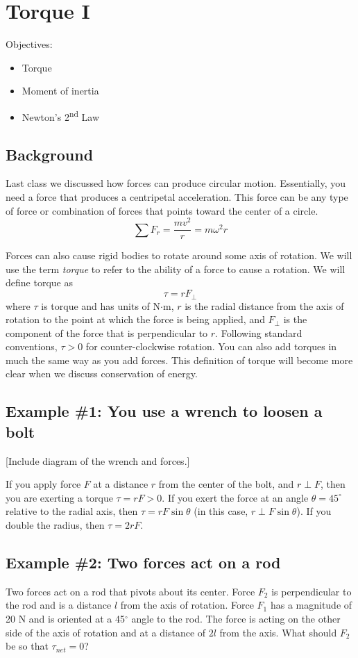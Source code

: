 \section{Torque I}
Objectives:
\begin{itemize}
\item Torque
\item Moment of inertia
\item Newton's 2\textsuperscript{nd} Law
\end{itemize}

\subsection{Background}
Last class we discussed how forces can produce circular motion. Essentially, you need a force that produces a centripetal acceleration. This force can be any type of force or combination of forces that points toward the center of a circle.
$$\sum F_r=\frac{mv^2}{r}=m\omega^2r$$

Forces can also cause rigid bodies to rotate around some axis of rotation. We will use the term \textit{torque} to refer to the ability of a force to cause a rotation. We will define torque as
$$\boxed{\tau=rF_\perp}$$
where $\tau$ is torque and has units of N$\cdot$m, $r$ is the radial distance from the axis of rotation to the point at which the force is being applied, and $F_\perp$ is the component of the force that is perpendicular to $r$. Following standard conventions, $\tau>0$ for counter-clockwise rotation. You can also add torques in much the same way as you add forces. This definition of torque will become more clear when we discuss conservation of energy.


\subsection{Example \#1: You use a wrench to loosen a bolt} 
[Include diagram of the wrench and forces.]
\vspace{5cm}

If you apply force $F$ at a distance $r$ from the center of the bolt, and $r\perp F$, then you are exerting a torque $\tau=rF>0$.  If you exert the force at an angle $\theta=45^\circ$ relative to the radial axis, then $\tau=rF\sin\theta$ (in this case, $r\perp F\sin\theta$). If you double the radius, then $\tau=2rF$.

\subsection{Example \#2: Two forces act on a rod}
Two forces act on a rod that pivots about its center. Force $F_2$ is perpendicular to the rod and is a distance $l$ from the axis of rotation. Force $F_1$ has a magnitude of 20 N and is oriented at a 45$^\circ$ angle to the rod. The force is acting on the other side of the axis of rotation and at a distance of $2l$ from the axis. What should $F_2$ be so that $\tau_{net}=0$?
\vspace{5cm}

